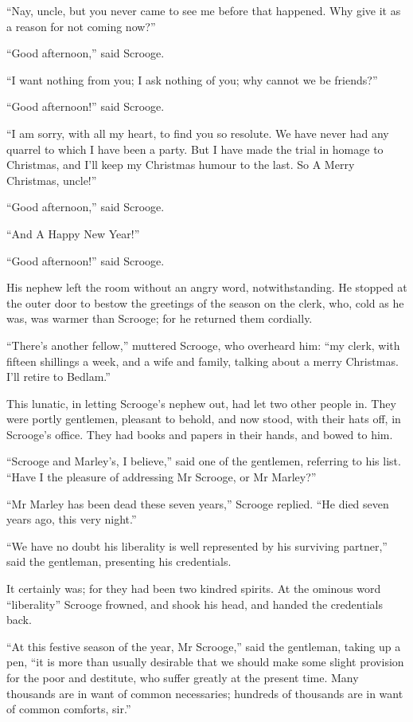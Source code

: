 \documentclass[paper=5.5in:8.5in,BCOR=5mm,twoside,DIV=calc,12pt,usegeometry]{scrbook} %
\begin{document}
\enquote{Nay, uncle, but you never came to see me before that happened. Why give it as a reason for not coming now?}

\enquote{Good afternoon,} said Scrooge.

\enquote{I want nothing from you; I ask nothing of you; why cannot we be friends?}

\enquote{Good afternoon!} said Scrooge.

\enquote{I am sorry, with all my heart, to find you so resolute. We have never had any quarrel to which I have been a party. But I have made the trial in homage to Christmas, and I'll keep my Christmas humour to the last. So A Merry Christmas, uncle!}

\enquote{Good afternoon,} said Scrooge.

\enquote{And A Happy New Year!}

\enquote{Good afternoon!} said Scrooge.

His nephew left the room without an angry word, notwithstanding. He stopped at the outer door to bestow the greetings of the season on the clerk, who, cold as he was, was warmer than Scrooge; for he returned them cordially.

\enquote{There's another fellow,} muttered Scrooge, who overheard him: \enquote{my clerk, with fifteen shillings a week, and a wife and family, talking about a merry Christmas. I'll retire to Bedlam.}

This lunatic, in letting Scrooge's nephew out, had let two other people in. They were portly gentlemen, pleasant to behold, and now stood, with their hats off, in Scrooge's office. They had books and papers in their hands, and bowed to him.

\enquote{Scrooge and Marley's, I believe,} said one of the gentlemen, referring to his list. \enquote{Have I the pleasure of addressing Mr Scrooge, or Mr Marley?}

\enquote{Mr Marley has been dead these seven years,} Scrooge replied. \enquote{He died seven years ago, this very night.}

\enquote{We have no doubt his liberality is well represented by his surviving partner,} said the gentleman, presenting his credentials.

It certainly was; for they had been two kindred spirits. At the ominous word \enquote{liberality} Scrooge frowned, and shook his head, and handed the credentials back.

\enquote{At this festive season of the year, Mr Scrooge,} said the gentleman, taking up a pen, \enquote{it is more than usually desirable that we should make some slight provision for the poor and destitute, who suffer greatly at the present time. Many thousands are in want of common necessaries; hundreds of thousands are in want of common comforts, sir.}
\end{document}
